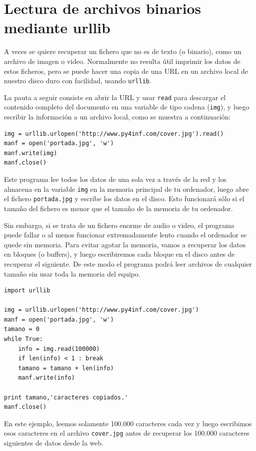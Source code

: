 \section{Lectura de archivos binarios mediante urllib}

A veces se quiere recuperar un fichero que no es de texto (o binario), como
un archivo de imagen o video. Normalmente no resulta útil imprimir los datos de
estos ficheros, pero se puede hacer una copia de una URL en un archivo
local de nuestro disco duro con facilidad, usando {\tt urllib}.

La pauta a seguir consiste en abrir la URL y usar {\tt read} para descargar el contenido
completo del documento en una variable de tipo cadena ({\tt img}), y luego escribir la
información a un archivo local, como se muestra a continuación:

\beforeverb
\begin{verbatim}
img = urllib.urlopen('http://www.py4inf.com/cover.jpg').read()
manf = open('portada.jpg', 'w')
manf.write(img)
manf.close()
\end{verbatim}
\afterverb
%
Este programa lee todos los datos de una sola vez a través de la red y los
almacena en la variable {\tt img} en la memoria principal de tu ordenador,
luego abre el fichero {\tt portada.jpg} y escribe los datos en el
disco. Esto funcionará sólo si el tamaño del fichero es menor que el tamaño
de la memoria de tu ordenador.

Sin embargo, si se trata de un fichero enorme de audio o video, el programa puede fallar
o al menos funcionar extremadamente lento cuando el ordenador se quede sin memoria.
Para evitar agotar la memoria, vamos a recuperar los datos en bloques
(o buffers), y luego escribiremos cada bloque en el disco antes de recuperar
el siguiente. De este modo el programa podrá leer archivos de cualquier tamaño sin
usar toda la memoria del equipo.

\beforeverb
\begin{verbatim}
import urllib

img = urllib.urlopen('http://www.py4inf.com/cover.jpg')
manf = open('portada.jpg', 'w')
tamano = 0
while True:
    info = img.read(100000)
    if len(info) < 1 : break
    tamano = tamano + len(info)
    manf.write(info)

print tamano,'caracteres copiados.'
manf.close()
\end{verbatim}
\afterverb
%
En este ejemplo, leemos solamente 100.000 caracteres cada vez y luego
escribimos esos caracteres en el archivo {\tt cover.jpg}
antes de recuperar los 100.000 caracteres siguientes de datos desde
la web.

